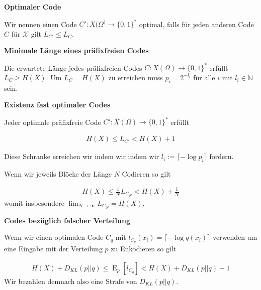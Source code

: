 \documentclass[25pt]{sciposter}
\newcommand{\N}{\mathbb{N}}
\newcommand{\E}{\operatorname{E}}
\newenvironment{defn}[1]{\begin{mdframed}[backgroundcolor=blue!10,innertopmargin=15pt, nobreak=true,innerbottommargin=15pt]
		\textbf{#1 }
	}
	{ 
	\end{mdframed}
}
\newenvironment{thm}[1]{\begin{mdframed}[nobreak=true,backgroundcolor=Emerald!10,innertopmargin=15pt, innerbottommargin=15pt]
		\textbf{#1 }
	}
	{ 
	\end{mdframed}
}
\begin{document}
\begin{multicols}{3}
\begin{defn}{Optimaler Code}
	Wir nennen einen Code ${C'}:{X}(\Omega^) \to \{0,1\}^*$ optimal, falls für jeden anderen Code $C$ für $\mathcal{X}$ gilt $L_{C'} \leq L_C$. 
\end{defn}



\begin{thm}{Minimale Länge eines präfixfreien Codes}
Die erwartete Länge jedes präfixfreien Codes $C: X(\Omega) \to \{0,1\}^*$ erfüllt $L_C \geq H(X)$. Um $L_C = H(X)$ zu erreichen muss $p_i = 2^{-l_i}$ für alle $i$ mit $l_i \in \N$ sein.
\end{thm}

\begin{thm}{Existenz fast optimaler Codes}
		Jeder optimale präfixfreie Code $C':X(\Omega) \to \{0,1\}^*$ erfüllt 
		
		\begin{align*}
			H(X) \leq L_{C'} < H(X) + 1
		\end{align*}
		
		Diese Schranke erreichen wir indem wir indem wir $l_i := \lceil -\log p_i \rceil$ fordern.
		
		Wenn wir jeweils Blöcke der Länge $N$ Codieren so gilt 
		
		\begin{align*}
			H(X) \leq \frac{1}{N} L_{C_N} < H(X) + \frac{1}{N}
 		\end{align*}
womit insbesondere $\lim_{N\to \infty} L_{C_N} = H(X)$.

\end{thm}

 
\begin{thm}{Codes bezüglich falscher Verteilung}
		Wenn wir einen optimalen Code $C_q$ mit $l_{C_q}(x_i) = \lceil-\log q(x_i) \rceil$ verwenden um eine Eingabe mit der Verteilung $p$ zu Enkodieren so gilt
	
	\begin{align*}
		H(X) + D_{KL}(p||q) \leq \E_p[l_{C_q}] < H(X) + D_{KL}(p||q)  + 1
	\end{align*} 
	Wir bezahlen demnach also eine Strafe von $D_{KL}(p||q)$.
	
\end{thm}



\end{multicols}
\end{document}
